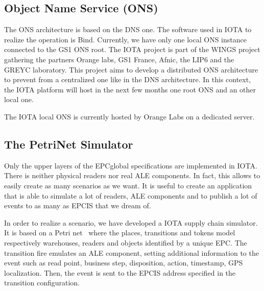 \documentclass[a4paper]{llncs}
\begin{document}
\subsection{Object Name Service (ONS)}
\label{subsec:ONS}

The ONS architecture is based on the DNS one. The software used in IOTA to
realize the operation is Bind. Currently, we have only one local ONS instance
connected to the GS1 ONS root. The IOTA project is part of the WINGS project
gathering the partners Orange labs, GS1 France, Afnic, the LIP6 and the GREYC
laboratory. This project aims to develop a distributed ONS architecture to
prevent from a centralized one like in the DNS architecture. In this context,
the IOTA platform will host in the next few months one root ONS and an other
local one.

The IOTA local ONS is currently hosted by Orange Labs on a dedicated server.




%
\subsection{The PetriNet Simulator}
\label{sec:simulator}

Only the upper layers of the EPCglobal specifications are implemented in
IOTA. There is neither physical readers nor real ALE components. In fact, this
allows to easily create as many scenarios as we want. It is useful to create an
application that is able to simulate a lot of readers, ALE components and to
publish a lot of events to as many as EPCIS that we dream of.

In order to realize a scenario, we have developed a IOTA supply chain
simulator. It is based on a Petri net~\cite{Kindler99thepetri} where the places,
transitions and tokens model respectively warehouses, readers and objects
identified by a unique EPC. The transition fire emulates an ALE component,
setting additional information to the event such as read point, business step,
disposition, action, timestamp, GPS localization.  Then, the event is sent to
the EPCIS address specified in the transition configuration.
\end{document}
